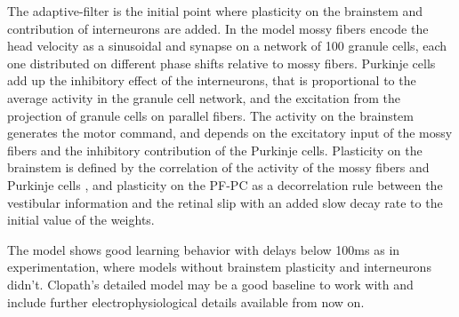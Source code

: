 \documentclass[12pt, a4paper,twoside]{tesi_upf}
\begin{document}
\begin{appendices}
The adaptive-filter is the initial point where plasticity on the brainstem and contribution of interneurons are added. In the model mossy fibers encode the head velocity as a sinusoidal \cite{Manuscript2009} and synapse on a network of 100 granule cells, each one distributed on different phase shifts relative to mossy fibers. Purkinje cells add up the inhibitory effect of the interneurons, that is proportional to the average activity in the granule cell network, and the excitation from the projection of granule cells on parallel fibers. The activity on the brainstem generates the motor command, and depends on the excitatory input of the mossy fibers and the inhibitory contribution of the Purkinje cells. Plasticity on the brainstem is defined by the correlation of the activity of the mossy fibers and Purkinje cells \cite{Menzies2010}, and plasticity on the PF-PC as a decorrelation rule between the vestibular information and the retinal slip \cite{Dean2002} with an added slow decay rate to the initial value of the weights.

The model shows good learning behavior with delays below 100ms as in experimentation, where models without brainstem plasticity and interneurons didn't. Clopath's detailed model may be a good baseline to work with and include further electrophysiological details available from now on.

\end{appendices}



\backmatter
\end{document}
